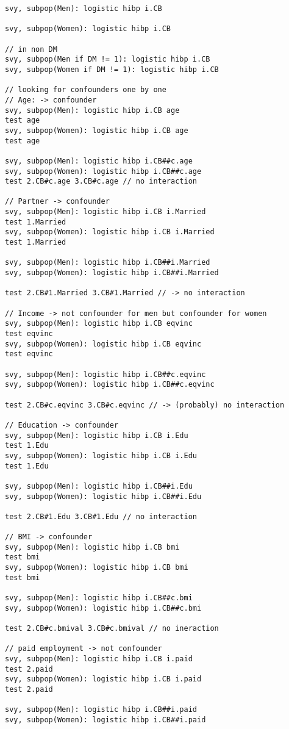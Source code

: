 \begin{verbatim}
svy, subpop(Men): logistic hibp i.CB

svy, subpop(Women): logistic hibp i.CB

// in non DM 
svy, subpop(Men if DM != 1): logistic hibp i.CB
svy, subpop(Women if DM != 1): logistic hibp i.CB

// looking for confounders one by one
// Age: -> confounder
svy, subpop(Men): logistic hibp i.CB age
test age
svy, subpop(Women): logistic hibp i.CB age
test age

svy, subpop(Men): logistic hibp i.CB##c.age
svy, subpop(Women): logistic hibp i.CB##c.age
test 2.CB#c.age 3.CB#c.age // no interaction

// Partner -> confounder
svy, subpop(Men): logistic hibp i.CB i.Married
test 1.Married
svy, subpop(Women): logistic hibp i.CB i.Married
test 1.Married

svy, subpop(Men): logistic hibp i.CB##i.Married
svy, subpop(Women): logistic hibp i.CB##i.Married

test 2.CB#1.Married 3.CB#1.Married // -> no interaction

// Income -> not confounder for men but confounder for women
svy, subpop(Men): logistic hibp i.CB eqvinc 
test eqvinc
svy, subpop(Women): logistic hibp i.CB eqvinc 
test eqvinc

svy, subpop(Men): logistic hibp i.CB##c.eqvinc 
svy, subpop(Women): logistic hibp i.CB##c.eqvinc 

test 2.CB#c.eqvinc 3.CB#c.eqvinc // -> (probably) no interaction

// Education -> confounder
svy, subpop(Men): logistic hibp i.CB i.Edu 
test 1.Edu
svy, subpop(Women): logistic hibp i.CB i.Edu 
test 1.Edu

svy, subpop(Men): logistic hibp i.CB##i.Edu 
svy, subpop(Women): logistic hibp i.CB##i.Edu 

test 2.CB#1.Edu 3.CB#1.Edu // no interaction

// BMI -> confounder
svy, subpop(Men): logistic hibp i.CB bmi
test bmi
svy, subpop(Women): logistic hibp i.CB bmi
test bmi

svy, subpop(Men): logistic hibp i.CB##c.bmi
svy, subpop(Women): logistic hibp i.CB##c.bmi

test 2.CB#c.bmival 3.CB#c.bmival // no ineraction

// paid employment -> not confounder
svy, subpop(Men): logistic hibp i.CB i.paid
test 2.paid
svy, subpop(Women): logistic hibp i.CB i.paid
test 2.paid

svy, subpop(Men): logistic hibp i.CB##i.paid
svy, subpop(Women): logistic hibp i.CB##i.paid


\end{verbatim}
